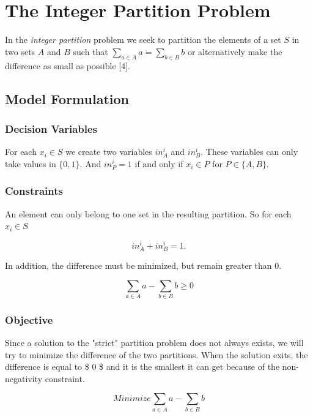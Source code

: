 \documentclass[11pt]{article}
\begin{document}
    \section{The Integer Partition
Problem}\label{the-integer-partition-problem}

In the \emph{integer partition} problem we seek to partition the
elements of a set \(S\) in two sets \(A\) and \(B\) such that
\(\sum_{a \in A} a = \sum_{b \in B} b\) or alternatively make the
difference as small as possible {[}4{]}.

\subsection{Model Formulation}\label{model-formulation}

\subsubsection{Decision Variables}\label{decision-variables}

For each \(x_i \in S\) we create two variables \(in_{A}^i\) and
\(in_{B}^i\). These variables can only take values in \(\{0,1\}\). And
\(in_{P}^i = 1\) if and only if \(x_i \in P\) for \(P \in \{A, B\}\).

\subsubsection{Constraints}\label{constraints}

An element can only belong to one set in the resulting partition. So for
each \(x_i \in S\)

\[in_A^i + in_B^i = 1.\]

In addition, the difference must be minimized, but remain greater than
0.

\[\sum_{a \in A}a - \sum_{b \in B}b \geq 0\]

\subsubsection{Objective}\label{objective}

Since a solution to the "strict" partition problem does not always
exists, we will try to minimize the difference of the two partitions.
When the solution exits, the difference is equal to \$ 0 \$ and it is
the smallest it can get because of the non-negativity constraint.

\[Minimize \sum_{a \in A}a - \sum_{b \in B}b\]
\end{document}
